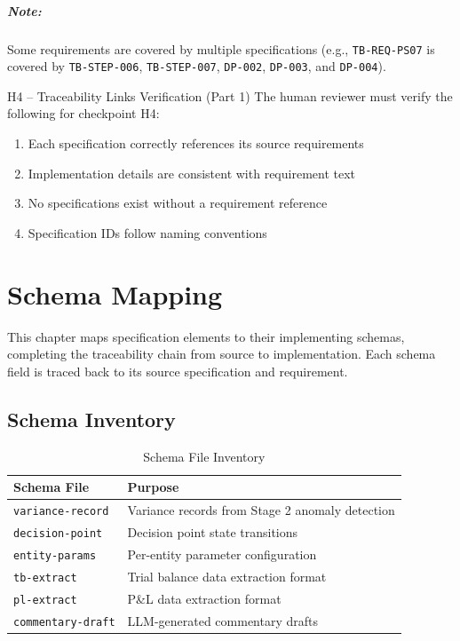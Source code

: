 \documentclass[11pt,a4paper,twoside]{report}
\newcommand{\reqref}[1]{\texttt{#1}}
\newcommand{\specref}[1]{\texttt{#1}}
\newcommand{\schemaref}[1]{\texttt{#1}}
\begin{document}
\paragraph{Note:} Some requirements are covered by multiple specifications
(e.g., \reqref{TB-REQ-PS07} is covered by \specref{TB-STEP-006},
\specref{TB-STEP-007}, \specref{DP-002}, \specref{DP-003}, and \specref{DP-004}).

\begin{hitlbox}{H4 -- Traceability Links Verification (Part 1)}
The human reviewer must verify the following for checkpoint H4:
\begin{enumerate}[noitemsep]
\item Each specification correctly references its source requirements
\item Implementation details are consistent with requirement text
\item No specifications exist without a requirement reference
\item Specification IDs follow naming conventions
\end{enumerate}
\end{hitlbox}
\chapter{Schema Mapping}
\label{ch:schema-mapping}

This chapter maps specification elements to their implementing schemas,
completing the traceability chain from source to implementation. Each
schema field is traced back to its source specification and requirement.

\section{Schema Inventory}
\label{sec:schema-inventory}

\begin{table}[h]
\centering
\caption{Schema File Inventory}
\label{tab:schema-inventory}
\begin{tabularx}{\textwidth}{@{}L{5cm}L{9cm}@{}}
\toprule
\textbf{Schema File} & \textbf{Purpose} \\
\midrule
\schemaref{variance-record} & Variance records from Stage 2 anomaly detection \\
\schemaref{decision-point} & Decision point state transitions \\
\schemaref{entity-params} & Per-entity parameter configuration \\
\schemaref{tb-extract} & Trial balance data extraction format \\
\schemaref{pl-extract} & P\&L data extraction format \\
\schemaref{commentary-draft} & LLM-generated commentary drafts \\
\bottomrule
\end{tabularx}
\end{table}
\end{document}
